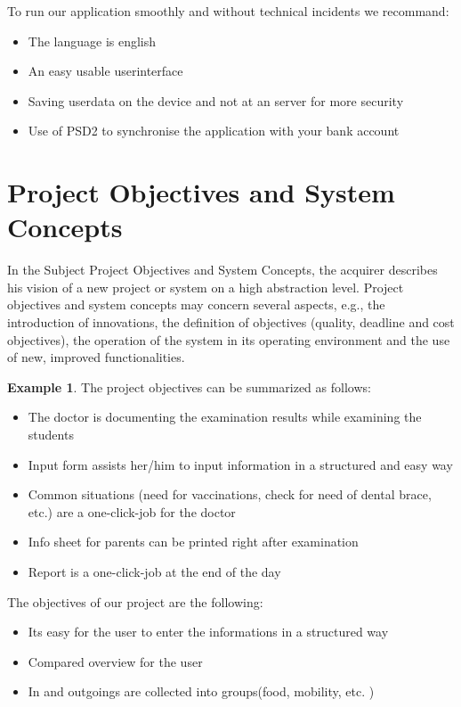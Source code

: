 \documentclass[12pt]{article}
\theoremstyle{definition}
\newtheorem{example}{Example}
\newenvironment{explanation}{%
   \setlength{\parindent}{0pt}
   \itshape
   \color{blue}
}{}
\begin{document}
To run our application smoothly and without technical incidents we recommand:
\begin{itemize}
	\item The language is english
	\item An easy usable userinterface
	\item Saving userdata on the device and not at an server for more security
	\item Use of PSD2 to synchronise the application with your bank account
\end{itemize}

\pagebreak

\section{Project Objectives and System Concepts}
\begin{explanation}
In the Subject Project Objectives and System Concepts, the acquirer describes his vision of a new project or system on a high abstraction level. Project objectives and system concepts may concern several aspects, e.g., the introduction of innovations, the definition of objectives (quality, deadline and cost objectives), the operation of the system in its operating environment and the use of new, improved functionalities.
\end{explanation}

\begin{example}
The project objectives can be summarized as follows:
\begin{itemize}
\item The doctor is documenting the examination results while examining the students
\item Input form assists her/him to input information in a structured and easy way
\item Common situations (need for vaccinations, check for need of dental brace, etc.) are a one-click-job for the doctor
\item Info sheet for parents can be printed right after examination
\item Report is a one-click-job at the end of the day
\end{itemize}
\end{example}

The objectives of our project are the following:
\begin{itemize}
\item Its easy for the user to enter the informations in a structured way
\item Compared overview for the user
\item In and outgoings are collected into groups(food, mobility, etc. )
\end{itemize}
\end{document}
